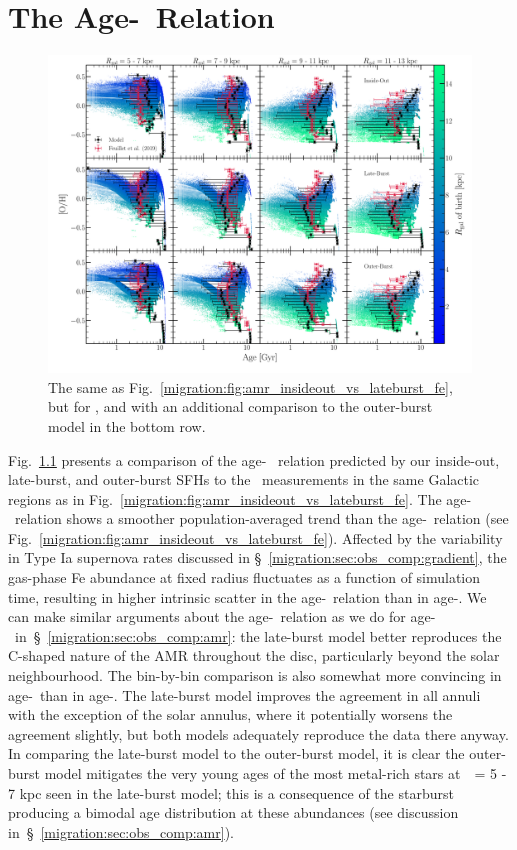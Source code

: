 
\chapter{The Age-\oh~Relation} 
\label{migration:sec:age_oh_relation}

\begin{figure} 
\includegraphics[scale = 0.32]{chapter5/age_oh_comparison.pdf} 
\caption{The same as Fig.~\ref{migration:fig:amr_insideout_vs_lateburst_fe}, but for 
\oh, and with an additional comparison to the outer-burst model in the 
bottom row.} 
\label{migration:fig:age_oh_comparison} 
\end{figure} 

Fig.~\ref{migration:fig:age_oh_comparison} presents a comparison of the age-\oh~ 
relation predicted by our inside-out, late-burst, and outer-burst SFHs to 
the~\citet{Feuillet2019} measurements in the same Galactic regions as in 
Fig.~\ref{migration:fig:amr_insideout_vs_lateburst_fe}. 
The age-\oh~relation shows a smoother population-averaged trend than the 
age-\feh~relation (see Fig.~\ref{migration:fig:amr_insideout_vs_lateburst_fe}). 
Affected by the variability in Type Ia supernova rates discussed in 
\S~\ref{migration:sec:obs_comp:gradient}, the gas-phase Fe abundance at fixed radius 
fluctuates as a function of simulation time, resulting in higher intrinsic 
scatter in the age-\feh~relation than in age-\oh. 
We can make similar arguments about the age-\oh~relation as we do for 
age-\feh~in~\S~\ref{migration:sec:obs_comp:amr}: the late-burst model better reproduces 
the C-shaped nature of the AMR throughout the disc, particularly beyond the 
solar neighbourhood. 
The bin-by-bin comparison is also somewhat more convincing in age-\oh~than in 
age-\feh. 
The late-burst model improves the agreement in all annuli with the exception of 
the solar annulus, where it potentially worsens the agreement slightly, but 
both models adequately reproduce the data there anyway. 
In comparing the late-burst model to the outer-burst model, it is clear the 
outer-burst model mitigates the very young ages of the most metal-rich stars 
at~\rgal~= 5 - 7 kpc seen in the late-burst model; this is a consequence of 
the starburst producing a bimodal age distribution at these abundances (see 
discussion in~\S~\ref{migration:sec:obs_comp:amr}). 

